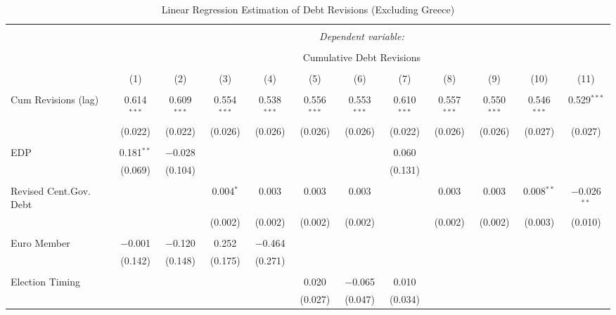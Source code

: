 
\begin{table}[!htbp] \centering 
  \caption{Linear Regression Estimation of Debt Revisions (Excluding Greece)} 
  \label{results_no_greece} 
\tiny 
\begin{tabular}{@{\extracolsep{5pt}}lccccccccccc} 
\\[-1.8ex]\hline 
\hline \\[-1.8ex] 
 & \multicolumn{11}{c}{\textit{Dependent variable:}} \\ 
\cline{2-12} 
\\[-1.8ex] & \multicolumn{11}{c}{Cumulative Debt Revisions} \\ 
\\[-1.8ex] & (1) & (2) & (3) & (4) & (5) & (6) & (7) & (8) & (9) & (10) & (11)\\ 
\hline \\[-1.8ex] 
 Cum Revisions (lag) & 0.614$^{***}$ & 0.609$^{***}$ & 0.554$^{***}$ & 0.538$^{***}$ & 0.556$^{***}$ & 0.553$^{***}$ & 0.610$^{***}$ & 0.557$^{***}$ & 0.550$^{***}$ & 0.546$^{***}$ & 0.529$^{***}$ \\ 
  & (0.022) & (0.022) & (0.026) & (0.026) & (0.026) & (0.026) & (0.022) & (0.026) & (0.026) & (0.027) & (0.027) \\ 
  & & & & & & & & & & & \\ 
 EDP & 0.181$^{**}$ & $-$0.028 &  &  &  &  & 0.060 &  &  &  &  \\ 
  & (0.069) & (0.104) &  &  &  &  & (0.131) &  &  &  &  \\ 
  & & & & & & & & & & & \\ 
 Revised Cent.Gov. Debt &  &  & 0.004$^{*}$ & 0.003 & 0.003 & 0.003 &  & 0.003 & 0.003 & 0.008$^{**}$ & $-$0.026$^{**}$ \\ 
  &  &  & (0.002) & (0.002) & (0.002) & (0.002) &  & (0.002) & (0.002) & (0.003) & (0.010) \\ 
  & & & & & & & & & & & \\ 
 Euro Member & $-$0.001 & $-$0.120 & 0.252 & $-$0.464 &  &  &  &  &  &  &  \\ 
  & (0.142) & (0.148) & (0.175) & (0.271) &  &  &  &  &  &  &  \\ 
  & & & & & & & & & & & \\ 
 Election Timing &  &  &  &  & 0.020 & $-$0.065 & 0.010 &  &  &  &  \\ 
  &  &  &  &  & (0.027) & (0.047) & (0.034) &  &  &  &  \\ 

\end{tabular}
\end{table}
